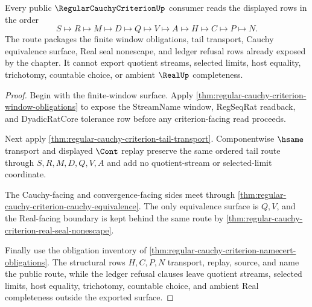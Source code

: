 \begin{theorem}
\label{thm:regular-cauchy-criterion-public-route}
Every public $\RegularCauchyCriterionUp$ consumer reads the displayed rows in the order
$$
S \longmapsto R \longmapsto M \longmapsto D \longmapsto Q \longmapsto V \longmapsto A \longmapsto H \longmapsto C \longmapsto P \longmapsto N .
$$
The route packages the finite window obligations, tail transport, Cauchy equivalence surface, Real seal nonescape, and ledger refusal rows already exposed by the chapter. It cannot export quotient streams, selected limits, host equality, trichotomy, countable choice, or ambient $\RealUp$ completeness.
\end{theorem}
\begin{proof}
Begin with the finite-window surface. Apply \autoref{thm:regular-cauchy-criterion-window-obligations} to expose the StreamName window, RegSeqRat readback, and DyadicRatCore tolerance row before any criterion-facing read proceeds.

Next apply \autoref{thm:regular-cauchy-criterion-tail-transport}. Componentwise $\hsame$ transport and displayed $\Cont$ replay preserve the same ordered tail route through $S,R,M,D,Q,V,A$ and add no quotient-stream or selected-limit coordinate.

The Cauchy-facing and convergence-facing sides meet through \autoref{thm:regular-cauchy-criterion-cauchy-equivalence}. The only equivalence surface is $Q,V$, and the Real-facing boundary is kept behind the same route by \autoref{thm:regular-cauchy-criterion-real-seal-nonescape}.

Finally use the obligation inventory of \autoref{thm:regular-cauchy-criterion-namecert-obligations}. The structural rows $H,C,P,N$ transport, replay, source, and name the public route, while the ledger refusal clauses leave quotient streams, selected limits, host equality, trichotomy, countable choice, and ambient Real completeness outside the exported surface.
\end{proof}

